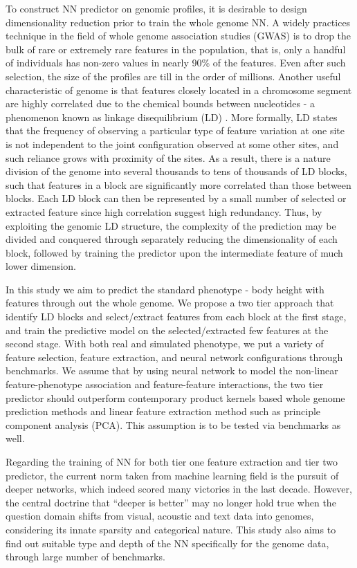 \documentclass[acmtog, authorversion]{acmart}
\begin{document}
To construct NN predictor on genomic profiles, it is desirable to design dimensionality reduction prior to train the whole genome NN. A widely practices technique in the field of whole genome association studies (GWAS) is to drop the bulk of rare or extremely rare features in the population, that is, only a handful of individuals has non-zero values in nearly 90\% of the features. Even after such selection, the size of the profiles are till in the order of millions. Another useful characteristic of genome is that features closely located in a chromosome segment are highly correlated due to the chemical bounds between nucleotides - a phenomenon known as linkage disequilibrium (LD) \cite{LD:Intro1, LD:Haploview}. More formally, LD states that the frequency of observing a particular type of feature variation at one site is not independent to the joint configuration observed at some other sites, and such reliance grows with proximity of the sites. As a result, there is a nature division of the genome into several thousands to tens of thousands of LD blocks, such that features in a block are significantly more correlated than those between blocks. Each LD block can then be represented by a small number of selected or extracted feature since high correlation suggest high redundancy. Thus, by exploiting the genomic LD structure, the complexity of the prediction may be divided and conquered through separately reducing the dimensionality of each block, followed by training the predictor upon the intermediate feature of much lower dimension.

In this study we aim to predict the standard phenotype - body height with features through out the whole genome. We propose a two tier approach that identify LD blocks and select/extract features from each block at the first stage, and train the predictive model on the selected/extracted few features at the second stage. With both real and simulated phenotype, we put a variety of feature selection, feature extraction, and neural network configurations through benchmarks. We assume that by using neural network to model the non-linear feature-phenotype association and feature-feature interactions, the two tier predictor should outperform contemporary product kernels based whole genome prediction methods \cite{WGP:Gustavo} and linear feature extraction method such as principle component analysis (PCA). This assumption is to be tested via benchmarks as well.

Regarding the training of NN for both tier one feature extraction and tier two predictor, the current norm taken from machine learning field is the pursuit of deeper networks, which indeed scored many victories in the last decade\cite{DL:Intro2, DL:Intro3}. However, the central doctrine that ``deeper is better'' may no longer hold true when the question domain shifts from visual, acoustic and text data into genomes, considering its innate sparsity and categorical nature. This study also aims to find out suitable type and depth of the NN specifically for the genome data, through large number of benchmarks.
\end{document}
